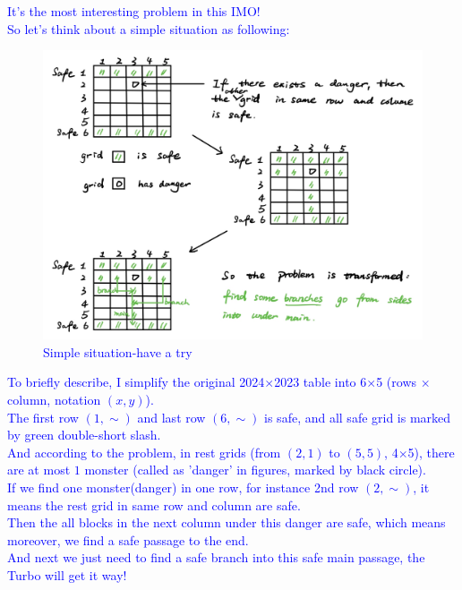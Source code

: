 \documentclass{Math_Note}
\begin{document}
\begin{sol}
\marginpar{\textcolor{green}{motivation}}
\textcolor{blue}{
It's the most interesting problem in this IMO! \\
So let's think about a simple situation as following: \\
\begin{figure}[H]
    \centering
    \includegraphics[scale=0.25]{"./Figures/Q5F1.png"}
    \caption{Simple situation-have a try}
\end{figure}
To briefly describe, I simplify the original 2024$\times$2023 table into 6$\times$5 (rows $\times$ column, notation $(x,y)$). \\
The first row $(1,\sim)$ and last row $(6,\sim)$ is safe, and all safe grid is marked by green double-short slash. \\
And according to the problem, in rest grids (from $(2,1)$ to $(5,5)$, 4$\times$5), there are at most $1$ monster (called as 'danger' in figures, marked by black circle). \\
\newline
If we find one monster(danger) in one row, for instance 2nd row $(2,\sim)$, it means the rest grid in same row and column are safe.\\
\newline
Then the all blocks in the next column under this danger are safe, which means moreover, we find a safe passage to the end.\\
And next we just need to find a safe branch into this safe main passage, the Turbo will get it way! \\
}
\newline

\end{sol}
\end{document}
